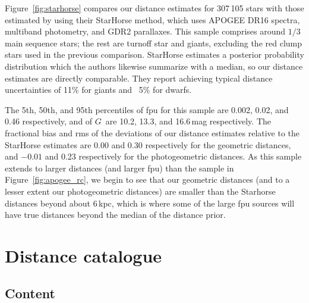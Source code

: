 \documentclass[twocolumn]{aastex62}
\providecommand{\gdr}[1]{GDR{#1}}
\providecommand{\gmag}{\ensuremath{G}}
\begin{document}
Figure~\ref{fig:starhorse} compares our distance estimates for 307\,105 stars with those estimated by \cite{2020A&A...638A..76Q} using their StarHorse method, which uses APOGEE DR16 spectra, multiband photometry, and \gdr{2} parallaxes.
This sample comprises around $1/3$ main sequence stars; the rest are turnoff star and giants, excluding the red clump stars used in the previous comparison. StarHorse estimates a posterior probability distribution which the authors likewise summarize with a median, so our distance estimates are directly comparable. They report achieving typical distance uncertainties of 11\% for giants and ~5\% for dwarfs.

The 5th, 50th, and 95th percentiles of fpu for this sample are 0.002, 0.02, and 0.46 respectively, and of \gmag\ are 10.2, 13.3, and 16.6\,mag respectively. 
The fractional bias and rms  of the deviations of our distance estimates relative to the StarHorse estimates are $0.00$ and 0.30 respectively for the geometric distances, and $-0.01$ and 0.23 respectively for the photogeometric distances. 
As this sample extends to larger distances (and larger fpu) than the sample in Figure~\ref{fig:apogee_rc}, we begin to see that our geometric distances (and to a lesser extent our photogeometric distances) are smaller than the Starhorse distances beyond about 6\,kpc, which is where some of the large fpu sources will have true distances beyond the median of the distance prior.



\vspace*{1em}
\section{Distance catalogue}\label{sec:catalogue}


\subsection{Content}\label{sec:catalogue_content}
\end{document}
